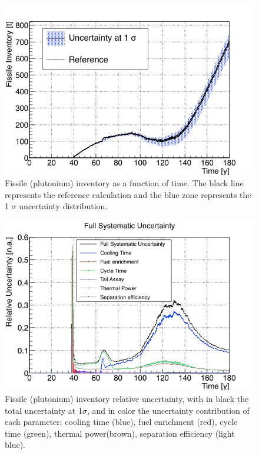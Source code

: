 \documentclass{anstrans}
\begin{document}
\begin{figure}[ht] %
    \centering
    \includegraphics[scale=0.35]{pu_full}
    \caption{Fissile (plutonium) inventory as a function of time. The black line
        represents the reference calculation and the blue zone
        represents the 1 $\sigma$ uncertainty distribution.}\label{fig:pu_full}
\end{figure}

\begin{figure}[h!!] %
    \centering
    \includegraphics[scale=0.35]{pu_uncer}
    \caption{Fissile (plutonium) inventory relative uncertainty, with
    in black the total uncertainty at 1$\sigma$, and in color the uncertainty
    contribution of each parameter: cooling time (blue), fuel enrichment (red),
    cycle time (green), thermal power(brown), separation efficiency (light
    blue).}\label{fig:pu_uncer}
\end{figure}
\end{document}
